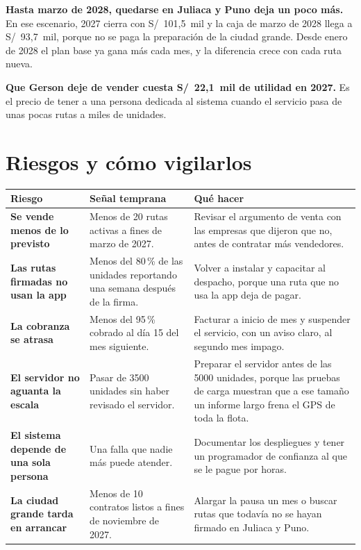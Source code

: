 \documentclass[10.5pt,a4paper]{article}
\begin{document}
\textbf{Hasta marzo de 2028, quedarse en Juliaca y Puno deja un poco más.} En ese escenario, 2027 cierra con S/~101,5~mil y la caja de marzo de 2028 llega a S/~93,7~mil, porque no se paga la preparación de la ciudad grande. Desde enero de 2028 el plan base ya gana más cada mes, y la diferencia crece con cada ruta nueva.

\textbf{Que Gerson deje de vender cuesta S/~22,1~mil de utilidad en 2027.} Es el precio de tener a una persona dedicada al sistema cuando el servicio pasa de unas pocas rutas a miles de unidades.

\section{Riesgos y cómo vigilarlos}

{\small
\begin{tabularx}{\linewidth}{@{}>{\bfseries}p{3.4cm}XX@{}}
\toprule
\normalfont Riesgo & Señal temprana & Qué hacer\\
\midrule
Se vende menos de lo previsto & Menos de 20 rutas activas a fines de marzo de 2027. & Revisar el argumento de venta con las empresas que dijeron que no, antes de contratar más vendedores.\\
Las rutas firmadas no usan la app & Menos del 80\,\% de las unidades reportando una semana después de la firma. & Volver a instalar y capacitar al despacho, porque una ruta que no usa la app deja de pagar.\\
La cobranza se atrasa & Menos del 95\,\% cobrado al día 15 del mes siguiente. & Facturar a inicio de mes y suspender el servicio, con un aviso claro, al segundo mes impago.\\
El servidor no aguanta la escala & Pasar de 3500 unidades sin haber revisado el servidor. & Preparar el servidor antes de las 5000 unidades, porque las pruebas de carga muestran que a ese tamaño un informe largo frena el GPS de toda la flota.\\
El sistema depende de una sola persona & Una falla que nadie más puede atender. & Documentar los despliegues y tener un programador de confianza al que se le pague por horas.\\
La ciudad grande tarda en arrancar & Menos de 10 contratos listos a fines de noviembre de 2027. & Alargar la pausa un mes o buscar rutas que todavía no se hayan firmado en Juliaca y Puno.\\
\bottomrule
\end{tabularx}}
\end{document}
